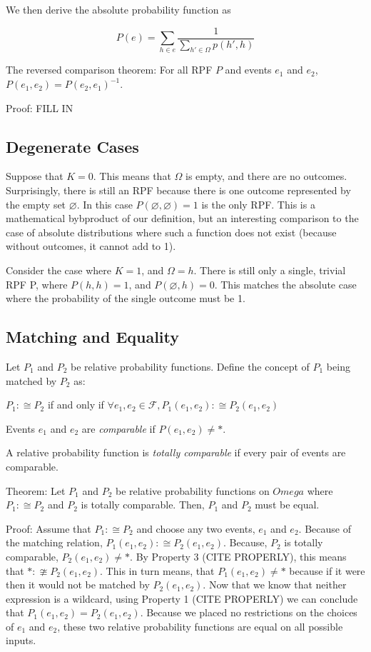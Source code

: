 \documentclass[twoside]{article}
\begin{document}
We then derive the absolute probability function as

\[P(e) = \sum_{h \in e} \frac{1}{\sum_{h' \in \Omega}p(h', h)}\]

The reversed comparison theorem: For all RPF \(P\) and events \(e_1\) and \(e_2\), \(P(e_1, e_2) = P(e_2, e_1)^{-1}\).

Proof: FILL IN

\subsection{Degenerate Cases}

Suppose that \(K = 0\). This means that \(\Omega\) is empty, and there are no outcomes. Surprisingly, there is still an RPF because there is one outcome represented by the empty set \(\varnothing\). In this case \(P(\varnothing, \varnothing) = 1\) is the only RPF. This is a mathematical bybproduct of our definition, but an interesting comparison to the case of absolute distributions where such a function does not exist (because without outcomes, it cannot add to 1).

Consider the case where \(K = 1\), and \(\Omega = {h}\). There is still only a single, trivial RPF P, where \(P(h, h) = 1\), and \(P(\varnothing, h) = 0\). This matches the absolute case where the probability of the single outcome must be 1.

\subsection{Matching and Equality}

Let \(P_1\) and \(P_2\) be relative probability functions. Define the concept of \(P_1\) being matched by \(P_2\) as:

\(P_1 :\cong P_2\) if and only if \(\forall e_1, e_2 \in \mathcal{F}, P_1(e_1, e_2) :\cong P_2(e_1, e_2)\)

Events \(e_1\) and \(e_2\) are \textit{comparable} if \(P(e_1, e_2) \neq \ast\).

A relative probability function is \textit{totally comparable} if every pair of events are comparable. 

Theorem: Let \(P_1\) and \(P_2\) be relative probability functions on \(Omega\) where \(P_1 :\cong P_2\) and \(P_2\) is totally comparable. Then, \(P_1\) and \(P_2\) must be equal.

Proof: Assume that \(P_1 :\cong P_2\) and choose any two events, \(e_1\) and \(e_2\). Because of the matching relation, \(P_1(e_1, e_2) :\cong P_2(e_1, e_2)\). Because, \(P_2\) is totally comparable, \(P_2(e_1, e_2) \neq \ast\). By Property 3 (CITE PROPERLY), this means that \(\ast :\ncong P_2(e_1, e_2)\). This in turn means, that \(P_1(e_1, e_2) \neq \ast\) because if it were then it would not be matched by \(P_2(e_1, e_2)\). Now that we know that neither expression is a wildcard, using Property 1 (CITE PROPERLY) we can conclude that \(P_1(e_1, e_2) = P_2(e_1, e_2)\). Because we placed no restrictions on the choices of \(e_1\) and \(e_2\), these two relative probability functions are equal on all possible inputs.
\end{document}
